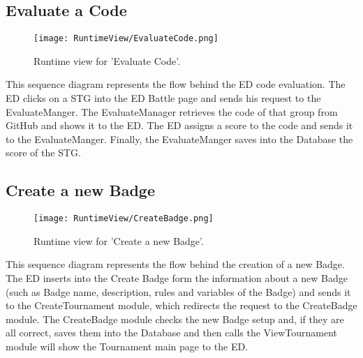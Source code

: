 \subsection{Evaluate a Code}
\begin{figure}[H]
    \begin{center}
        \texttt{[image: RuntimeView/EvaluateCode.png]}
        \caption{Runtime view for 'Evaluate Code'.}
        \label{fig:runtime_evaluatecode}%
    \end{center}
\end{figure}
This sequence diagram represents the flow behind the ED code evaluation.
The ED clicks on a STG into the ED Battle page and sends his request to the EvaluateManger. The EvaluateManager retrieves the code of that group from GitHub and shows it to the ED. The ED assigns a score to the code and sends it to the EvaluateManger. Finally, the EvaluateManger saves into the Database the score of the STG.

\subsection{Create a new Badge}
\begin{figure}[H]
    \begin{center}
        \texttt{[image: RuntimeView/CreateBadge.png]}
        \caption{Runtime view for 'Create a new Badge'.}
        \label{fig:runtime_createbadge}%
    \end{center}
\end{figure}
This sequence diagram represents the flow behind the creation of a new Badge. The ED inserts into the Create Badge form the information about a new Badge (such as Badge name, description, rules and variables of the Badge) and sends it to the CreateTournament module, which redirects the request to the CreateBadge module. The CreateBadge module checks the new Badge setup and, if they are all correct, saves them into the Database and then calls the ViewTournament module will show the Tournament main page to the ED.

